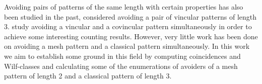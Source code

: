 Avoiding pairs of patterns of the same length with certain properties has
also been studied in the past, \textcite{MR2178749} considered avoiding a
pair of vincular patterns of length 3. \textcite{2015arXiv151203226B} study avoiding
a vincular and a covincular pattern simultaneously in order to achieve some
interesting counting results. However, very little work has been done on avoiding
a mesh pattern and a classical pattern simultaneously. In this work we aim to
establish some ground in this field by computing coincidences and Wilf-classes
and calculating some of the enumerations of avoiders of a mesh pattern of length
2 and a classical pattern of length 3.

